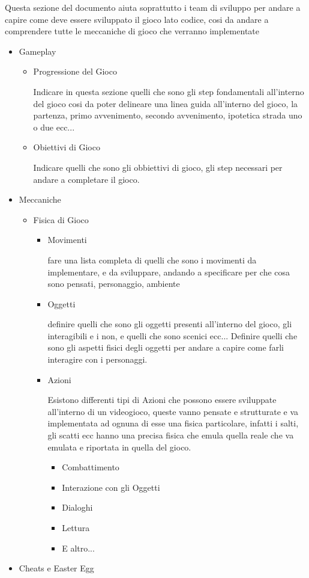 \documentclass{report}
\begin{document}
Questa sezione del documento aiuta soprattutto i team di sviluppo per andare a capire come deve essere sviluppato il gioco lato codice, cosi da andare a comprendere tutte le meccaniche di gioco che verranno implementate
\begin{itemize}
    \item Gameplay
    \begin{itemize}
        \item Progressione del Gioco

        Indicare in questa sezione quelli che sono gli step fondamentali all'interno del gioco cosi da poter delineare una linea guida all'interno del gioco, la partenza, primo avvenimento, secondo avvenimento, ipotetica strada uno o due ecc...
        \item Obiettivi di Gioco

        Indicare quelli che sono gli obbiettivi di gioco, gli step necessari per andare a completare il gioco.
    \end{itemize}
    \item Meccaniche
    \begin{itemize}
        \item Fisica di Gioco
        \begin{itemize}
            \item Movimenti

            fare una lista completa di quelli che sono i movimenti da implementare, e da sviluppare, andando a specificare per che cosa sono pensati, personaggio, ambiente
            \item Oggetti

            definire quelli che sono gli oggetti presenti all'interno del gioco, gli interagibili e i non, e quelli che sono scenici ecc...
            Definire quelli che sono gli aspetti fisici degli oggetti per andare a capire come farli interagire con i personaggi. 
            \item Azioni

            Esistono differenti tipi di Azioni che possono essere sviluppate all'interno di un videogioco, queste vanno pensate e strutturate e va implementata ad ognuna di esse una fisica particolare, infatti i salti, gli scatti ecc hanno una precisa fisica che emula quella reale che va emulata e riportata in quella del gioco.
            \begin{itemize}
                \item Combattimento
                \item Interazione con gli Oggetti
                \item Dialoghi
                \item Lettura
                \item E altro...
            \end{itemize}
        \end{itemize}
    \end{itemize}
    \item Cheats e Easter Egg


\end{itemize}
\end{document}
